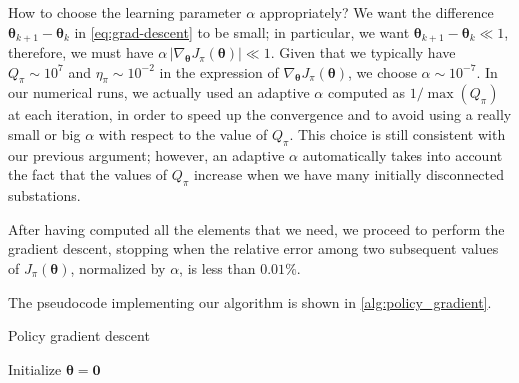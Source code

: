 How to choose the learning parameter $\alpha$ appropriately? We want the difference $\boldsymbol \theta_{k+1} - \boldsymbol \theta_k$ in \eqref{eq:grad-descent} to be small; in particular, we want $\boldsymbol \theta_{k+1} - \boldsymbol \theta_k \ll 1$, therefore, we must have $\alpha \, |\nabla_{\boldsymbol \theta} J_\pi (\boldsymbol \theta)| \ll 1$. Given that we typically have $Q_\pi \sim 10^7$ and $\eta_\pi \sim 10^{-2}$ in the expression of $\nabla_{\boldsymbol \theta} J_\pi (\boldsymbol \theta)$, we choose $\alpha \sim 10^{-7}$. In our numerical runs, we actually used an adaptive $\alpha$ computed as $1 / \max(Q_\pi)$ at each iteration, in order to speed up the convergence and to avoid using a really small or big $\alpha$ with respect to the value of $Q_\pi$. This choice is still consistent with our previous argument; however, an adaptive $\alpha$ automatically takes into account the fact that the values of $Q_\pi$ increase when we have many initially disconnected substations.

After having computed all the elements that we need, we proceed to perform the gradient descent, stopping when the relative error among two subsequent values of $J_\pi (\boldsymbol \theta)$, normalized by $\alpha$, is less than $0.01\%$.

The pseudocode implementing our algorithm is shown in \autoref{alg:policy_gradient}.

\begin{algorithm}
    \DontPrintSemicolon
    \caption{Policy gradient descent}
    \label{alg:policy_gradient}
        Initialize $\boldsymbol \theta = \mathbf 0$\;
\end{algorithm}